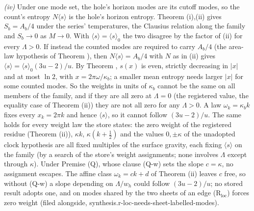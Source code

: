 \emph{(iv)} Under one mode set, the hole's horizon modes are its cutoff modes, so the count's entropy $N\langle s\rangle$ is the hole's horizon entropy. Theorem (i),(ii) gives $S_{b} = A_{b}/4$ under the series' temperatures, the Clausius relation along the family and $S_{b} \to 0$ as $M \to 0$. With $\langle s\rangle = \langle s\rangle_{0}$ the two disagree by the factor of (ii) for every $\Lambda > 0$. If instead the counted modes are required to carry $A_{b}/4$ (the area-law hypothesis of Theorem ), then $N\langle s\rangle = A_{b}/4$ with $N$ as in (ii) gives $\langle s\rangle = \langle s\rangle_{0}(3u - 2)/u$. By Theorem , $s(x)$ is even, strictly decreasing in $|x|$ and at most $\ln 2$, with $x = 2\pi\omega/\kappa_{b}$; a smaller mean entropy needs larger $|x|$ for some counted modes. So the weights in units of $\kappa_{b}$ cannot be the same on all members of the family, and if they are all zero at $\Lambda = 0$ (the registered value, the equality case of Theorem (ii)) they are not all zero for any $\Lambda > 0$. A law $\omega_{k} = \kappa_{b}k$ fixes every $x_{k} = 2\pi k$ and hence $\langle s\rangle$, so it cannot follow $(3u - 2)/u$. The same holds for every weight law the store states: the zero weight of the registered residue (Theorem (ii)), $\kappa k$, $\kappa(k + \tfrac12)$ and the values $0, \pm\kappa$ of the unadopted clock hypothesis are all fixed multiples of the surface gravity, each fixing $\langle s\rangle$ on the family (by a search of the store's weight assignments; none involves $\Lambda$ except through $\kappa$). Under Premise (Q), whose clause (Q-w) sets the slope $c = \kappa$, no assignment escapes. The affine class $\omega_{k} = ck + d$ of Theorem (ii) leaves $c$ free, so without (Q-w) a slope depending on $\Lambda/w_{h}$ could follow $(3u - 2)/u$; no stored result adopts one, and on modes shared by the two sheets of an edge (R$_{\mathrm{loc}}$) forces zero weight (filed alongside, synthesis.r-loc-needs-sheet-labelled-modes).

